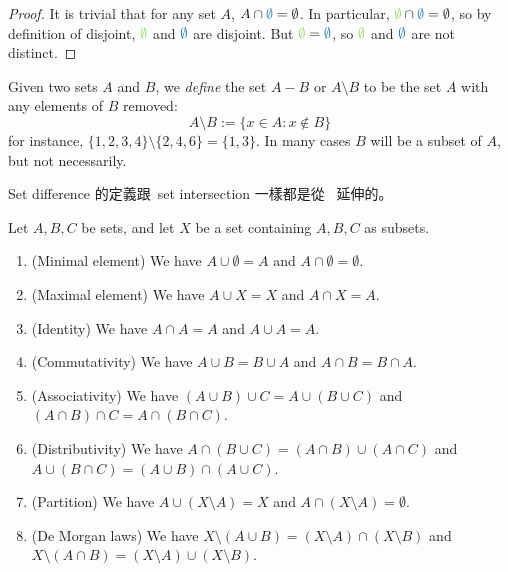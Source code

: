 \begin{proof}
It is trivial that for any set \(A\), \(A \cap \BLUE{\emptyset} = \emptyset\). In particular, \(\GREEN{\emptyset} \cap \BLUE{\emptyset} = \emptyset\), so by definition of disjoint, \(\GREEN{\emptyset}\) and \(\BLUE{\emptyset}\) are disjoint. But \(\GREEN{\emptyset} = \BLUE{\emptyset}\), so \(\GREEN{\emptyset}\) and \(\BLUE{\emptyset}\) are not distinct.
\end{proof}

\begin{definition}  \label{def 3.1.27}
Given two sets \(A\) and \(B\), we \emph{define} the set \(A - B\) or \(A \setminus B\) to be the set \(A\) with any elements of \(B\) removed:
\[
A \setminus B := \{ x \in A : x \notin B \}
\]
for instance, \( \{ 1, 2, 3, 4 \} \setminus \{ 2, 4, 6 \}  = \{ 1, 3 \} \). In many cases \(B\) will be a subset of \(A\), but not necessarily.
\end{definition}

\begin{note}
Set difference 的定義跟\ set intersection 一樣都是從\  延伸的。
\end{note}

\begin{proposition}  \label{prop 3.1.28} 
Let \(A, B, C\) be sets, and let \(X\) be a set containing \(A, B, C\) as subsets.
\begin{enumerate}
    \item (Minimal element) We have \(A \cup \emptyset = A\) and \(A \cap \emptyset = \emptyset\).
    \item (Maximal element) We have \(A \cup X = X\) and \(A \cap X = A\).
    \item (Identity) We have \(A \cap A = A\) and \(A \cup A = A\).
    \item (Commutativity) We have \(A \cup B = B \cup A\) and \(A \cap B = B \cap A\).
    \item (Associativity) We have \((A \cup B) \cup C = A \cup (B \cup C)\) and \((A \cap B) \cap C = A \cap (B \cap C)\).
    \item (Distributivity) We have \(A \cap (B \cup C) = (A \cap B) \cup (A \cap C)\) and \(A \cup (B \cap C) = (A \cup B) \cap (A \cup C)\).
    \item (Partition) We have \(A \cup (X \setminus A) = X\) and \(A \cap (X \setminus A) = \emptyset\).
    \item (De Morgan laws) We have \(X \setminus (A \cup B) = (X \setminus A) \cap (X \setminus B) \) and \(X \setminus (A \cap B) = (X \setminus A) \cup (X \setminus B)\).
\end{enumerate}
\end{proposition}


